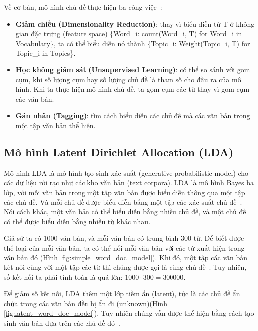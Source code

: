 Về cơ bản, mô hình chủ đề thực hiện ba công
việc~\cite{kapadiaTopicModelingPython2020}:

\begin{itemize}
	\item \textbf{Giảm chiều (Dimensionality Reduction)}: thay vì biểu diễn từ
		T ở không gian đặc trưng (feature space) \{Word\_i: count(Word\_i, T)
		for Word\_i in Vocabulary\}, ta có thể biểu diễn nó thành \{Topic\_i:
		Weight(Topic\_i, T) for Topic\_i in Topics\}.
	
	\item \textbf{Học không giám sát (Unsupervised Learning)}: có thể so sánh
		với gom cụm, khi số lượng cụm hay số lượng chủ đề là tham số cho đầu ra
		của mô hình. Khi ta thực hiện mô hình chủ đề, ta gọm cụm các từ thay vì
		gom cụm các văn bản.
	
	\item \textbf{Gán nhãn (Tagging)}: tìm cách biểu diễn các chủ đề mà các văn
		bản trong một tập văn bản thể hiện.
\end{itemize}

\subsection{Mô hình Latent Dirichlet Allocation (LDA)}
Mô hình LDA là mô hình tạo sinh xác suất (generative probabilistic model) cho
các dữ liệu rời rạc như các kho văn bản (text corpora). LDA là mô hình Bayes ba
lớp, với mỗi văn bản trong một tập văn bản được biểu diễn thông qua một tập các
chủ đề. Và mỗi chủ đề được biểu diễn bằng một tập các xác suất chủ
đề~\cite{bleiLatentDirichletAllocation2003}. Nói cách khác, một văn bản có thể
biểu diễn bằng nhiều chủ đề, và một chủ đề có thể được biểu diễn bằng nhiều từ
khác nhau.

Giả sử ta có 1000 văn bản, và mỗi văn bản có trung bình 300 từ. Để biết được thể
loại của mỗi văn bản, ta có thể nối mỗi văn bản với các từ xuất hiện trong văn
bản đó (Hình \ref{fig:simple_word_doc_model}). Khi đó, một tập các văn bản kết
nối cùng với một tập các từ thì chúng được gọi là cùng chủ
đề~\cite{ganegedaraIntuitiveGuideLatent2021}. Tuy nhiên, số kết nối ta phải tính
toán là quá lớn: $1000 \cdot 300 = 300000$.


Để giảm số kết nối, LDA thêm một lớp tiềm ẩn (latent), tức là các chủ đề ẩn chứa
trong các văn bản đều bị ẩn đi (unknown)(Hình \ref{fig:latent_word_doc_model}).
Tuy nhiên chúng vẫn được thể hiện bằng cách tạo sinh văn bản dựa trên các chủ đề
đó~\cite{tomarTopicModelingUsing2019}.

